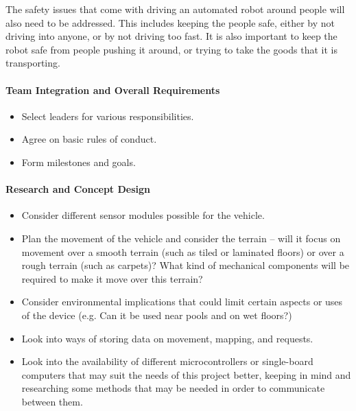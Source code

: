 \documentclass[11pt]{article}
\begin{document}
The safety issues that come with driving an automated robot around people will also need to be addressed. This includes keeping the people safe, either by not driving into anyone, or by not driving too fast. It is also important to keep the robot safe from people pushing it around, or trying to take the goods that it is transporting.

\paragraph{Team Integration and Overall Requirements}
\begin{itemize}
\item{Select leaders for various responsibilities.}
\item{Agree on basic rules of conduct.}
\item{Form milestones and goals.}
\end{itemize}
\paragraph{Research and Concept Design}
\begin{itemize}
\item{Consider different sensor modules possible for the vehicle.}
\item{Plan the movement of the vehicle and consider the terrain – will it focus on movement over a smooth terrain (such as tiled or laminated floors) or over a rough terrain (such as carpets)? What kind of mechanical components will be required to make it move over this terrain?}
\item{Consider environmental implications that could limit certain aspects or uses of the device (e.g. Can it be used near pools and on wet floors?)}
\item{Look into ways of storing data on movement, mapping, and requests.}
\item{Look into the availability of different microcontrollers or single-board computers that may suit the needs of this project better, keeping in mind and researching some methods that may be needed in order to communicate between them.}
\end{itemize}
\end{document}
